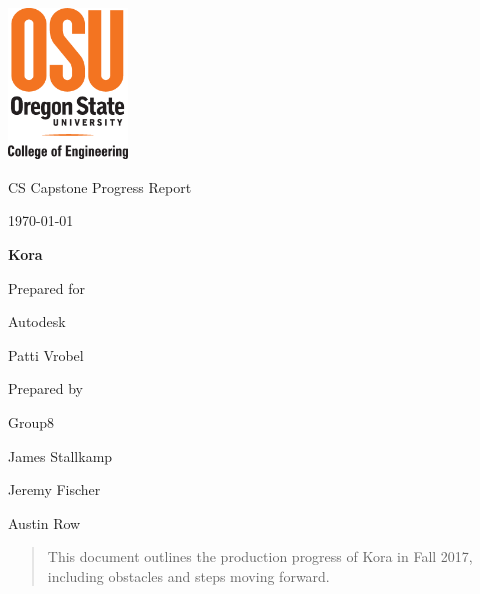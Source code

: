 \documentclass[onecolumn, draftclsnofoot,10pt, compsoc]{IEEEtran}
\def \CapstoneTeamName{\textbf{Insert Team Name Here} }
\def \CapstoneTeamNumber{8}
\def \GroupMemberOne{James Stallkamp}
\def \GroupMemberTwo{Jeremy Fischer}
\def \GroupMemberThree{Austin Row}
\def \CapstoneProjectName{Kora}
\def \CapstoneSponsorCompany{Autodesk}
\def \CapstoneSponsorPerson{Patti Vrobel}
\def \DocType{		%
				Progress Report
				}
\newcommand{\NameSigPair}[1]{\par
\makebox[2.75in][r]{#1} \hfil 	\makebox[3.25in]{\makebox[2.25in]{\hrulefill} \hfill		\makebox[.75in]{\hrulefill}}
\par\vspace{-12pt} \textit{\tiny\noindent
\makebox[2.75in]{} \hfil		\makebox[3.25in]{\makebox[2.25in][r]{Signature} \hfill	\makebox[.75in][r]{Date}}}}
\renewcommand{\NameSigPair}[1]{#1}
\begin{document}
\begin{titlepage}
    \begin{singlespace}
    	\includegraphics[height=4cm]{coe_v_spot1}
        \par\vspace{.2in}
        \centering
        \scshape{
            \huge CS Capstone \DocType \par
            {\large\today}\par
            \vspace{.5in}
            \textbf{\Huge\CapstoneProjectName}\par
            \vfill
            {\large Prepared for}\par
            \Huge \CapstoneSponsorCompany\par
            \vspace{5pt}
            {\Large\NameSigPair{\CapstoneSponsorPerson}\par}
            {\large Prepared by }\par
            Group\CapstoneTeamNumber\par
            \vspace{5pt}
            {\Large
                \NameSigPair{\GroupMemberOne}\par
                \NameSigPair{\GroupMemberTwo}\par
                \NameSigPair{\GroupMemberThree}\par
            }
            \vspace{20pt}
        }
        \begin{abstract}
			This document outlines the production progress of Kora in Fall 2017, including obstacles and steps moving forward.
        \end{abstract}     
    \end{singlespace}
\end{titlepage}
\newpage
{}
\tableofcontents
\clearpage
\end{document}
